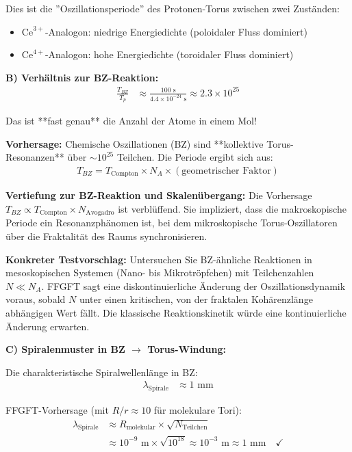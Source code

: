 Dies ist die ''Oszillationsperiode'' des Protonen-Torus zwischen zwei Zuständen:
\begin{itemize}
	\item $\text{Ce}^{3+}$-Analogon: niedrige Energiedichte (poloidaler Fluss dominiert)
	\item $\text{Ce}^{4+}$-Analogon: hohe Energiedichte (toroidaler Fluss dominiert)
\end{itemize}

\textbf{B) Verhältnis zur BZ-Reaktion:}
\begin{align*}
	\frac{T_{BZ}}{T_p} &\approx \frac{100 \text{ s}}{4.4 \times 10^{-24} \text{ s}} \approx 2.3 \times 10^{25}
\end{align*}

Das ist **fast genau** die Anzahl der Atome in einem Mol!

\textbf{Vorhersage:} Chemische Oszillationen (BZ) sind **kollektive Torus-Resonanzen** über $\sim 10^{25}$ Teilchen. Die Periode ergibt sich aus:
\begin{align*}
	T_{BZ} = T_{\text{Compton}} \times N_A \times (\text{geometrischer Faktor})
\end{align*}

\textbf{Vertiefung zur BZ-Reaktion und Skalenübergang:}
Die Vorhersage $T_{BZ} \propto T_{\text{Compton}} \times N_{\text{Avogadro}}$ ist verblüffend. Sie impliziert, dass die makroskopische Periode ein Resonanzphänomen ist, bei dem mikroskopische Torus-Oszillatoren über die Fraktalität des Raums synchronisieren.

\textbf{Konkreter Testvorschlag:} Untersuchen Sie BZ-ähnliche Reaktionen in mesoskopischen Systemen (Nano- bis Mikrotröpfchen) mit Teilchenzahlen $N \ll N_A$. FFGFT sagt eine diskontinuierliche Änderung der Oszillationsdynamik voraus, sobald $N$ unter einen kritischen, von der fraktalen Kohärenzlänge abhängigen Wert fällt. Die klassische Reaktionskinetik würde eine kontinuierliche Änderung erwarten.

\textbf{C) Spiralenmuster in BZ $\rightarrow$ Torus-Windung:}

Die charakteristische Spiralwellenlänge in BZ:
\begin{align*}
	\lambda_{\text{Spirale}} &\approx 1 \text{ mm}
\end{align*}

FFGFT-Vorhersage (mit $R/r \approx 10$ für molekulare Tori):
\begin{align*}
	\lambda_{\text{Spirale}} &\approx R_{\text{molekular}} \times \sqrt{N_{\text{Teilchen}}} \\
	&\approx 10^{-9} \text{ m} \times \sqrt{10^{18}} \approx 10^{-3} \text{ m} \approx 1 \text{ mm} \quad \checkmark
\end{align*}

